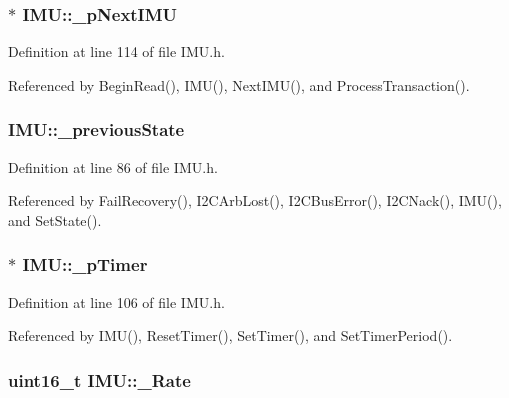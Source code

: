 \hypertarget{class_i_m_u_a72d5aa462d6627b458db76ca6567d130}{
\subsubsection[{\_\-pNextIMU}]{$\ast$ {\bf IMU::\_\-pNextIMU}}}
\label{class_i_m_u_a72d5aa462d6627b458db76ca6567d130}


Definition at line 114 of file IMU.h.



Referenced by BeginRead(), IMU(), NextIMU(), and ProcessTransaction().

\hypertarget{class_i_m_u_aca284ca1bcf10458005d4ca630833ea9}{
\subsubsection[{\_\-previousState}]{ {\bf IMU::\_\-previousState}}}
\label{class_i_m_u_aca284ca1bcf10458005d4ca630833ea9}


Definition at line 86 of file IMU.h.



Referenced by FailRecovery(), I2CArbLost(), I2CBusError(), I2CNack(), IMU(), and SetState().

\hypertarget{class_i_m_u_a16e73b1457a346aed16d4b61fae7f2c4}{
\subsubsection[{\_\-pTimer}]{$\ast$ {\bf IMU::\_\-pTimer}}}
\label{class_i_m_u_a16e73b1457a346aed16d4b61fae7f2c4}


Definition at line 106 of file IMU.h.



Referenced by IMU(), ResetTimer(), SetTimer(), and SetTimerPeriod().

\hypertarget{class_i_m_u_aafe9be107385c7ccedeb1539cf6d7fce}{
\subsubsection[{\_\-Rate}]{\setlength{\rightskip}{0pt plus 5cm}uint16\_\-t {\bf IMU::\_\-Rate}}}
\label{class_i_m_u_aafe9be107385c7ccedeb1539cf6d7fce}


